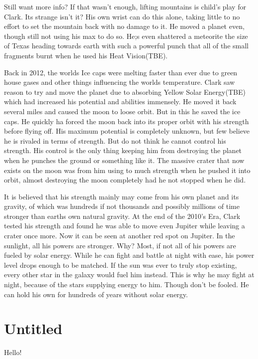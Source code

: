 \documentclass[a1paper]{article}
\begin{document}
\begin{multicols}{7}
{Still want more info? If that wasn’t enough, lifting mountains is child's play for Clark. Its strange isn’t it?  His own wrist can do this alone, taking little to no effort to set the mountain back with no damage to it. He moved a planet even, though still not using his max to do so. He;s even shattered a meteorite the size of Texas heading towards earth with such a powerful punch that all of the small fragments burnt when he used his Heat Vision(TBE).

Back in 2012, the worlds Ice caps were melting faster than ever due to green house gases and other things influencing the worlds temperature. Clark saw reason to try and move the planet due to absorbing Yellow Solar Energy(TBE) which had increased his potential and abilities immensely. He moved it back several miles and caused the moon to loose orbit. But in this he saved the ice caps. He quickly ha forced the moon back into its proper orbit with his strength before flying off.  His maximum potential is completely unknown, but few believe he is rivaled in terms of strength. But do not think he cannot control his strength. His control is the only thing keeping him from destroying the planet when he punches the ground or something like it. The massive crater that now exists on the moon was from him using to much strength when he pushed it into orbit, almost destroying the moon completely had he not stopped when he did. 

It is believed that his strength mainly may come from his own planet and its gravity, of which was hundreds if not thousands and possibly millions of time stronger than earths own natural gravity. At the end of the 2010’s Era, Clark tested his strength and found he was able to move even Jupiter while leaving a crater once more. Now it can be seen at another red spot on Jupiter. In the sunlight, all his powers are stronger. Why? Most, if not all of his powers are fueled by solar energy. While he can fight and battle at night with ease, his power level drops enough to be matched. If the sun was ever to truly stop existing, every other star in the galaxy would fuel him instead. This is why he may fight at night, because of the stars supplying energy to him. Though don’t be fooled. He can hold his own for hundreds of years without solar energy.




\section{Untitled}
Hello!

}
\end{multicols}
\end{document}
